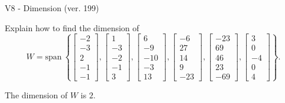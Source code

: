 \begin{exercise}
  \begin{exerciseTitle}V8 - Dimension (ver. 199)\end{exerciseTitle}
  \begin{exerciseStatement}
    Explain how to find the dimension of 
\[W=\mathrm{span}\ \left\{\left[\begin{array}{r}
-2 \\
-3 \\
2 \\
-1 \\
-1
\end{array}\right] , \left[\begin{array}{r}
1 \\
-3 \\
-2 \\
-1 \\
3
\end{array}\right] , \left[\begin{array}{r}
6 \\
-9 \\
-10 \\
-3 \\
13
\end{array}\right] , \left[\begin{array}{r}
-6 \\
27 \\
14 \\
9 \\
-23
\end{array}\right] , \left[\begin{array}{r}
-23 \\
69 \\
46 \\
23 \\
-69
\end{array}\right] , \left[\begin{array}{r}
3 \\
0 \\
-4 \\
0 \\
4
\end{array}\right]\right\}.\]



  \end{exerciseStatement}
  \begin{exerciseAnswer}
   The dimension of \(W\) is  \(2\).
  


  \end{exerciseAnswer}
\end{exercise}